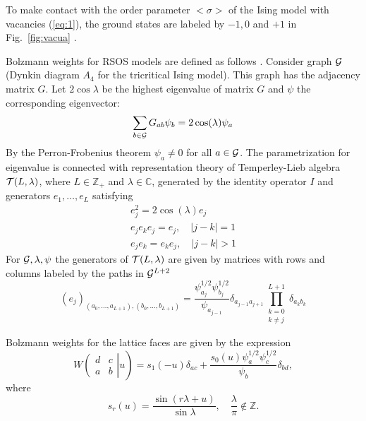 \documentclass[12pt]{article}
\begin{document}
To make contact with the order parameter $<\sigma>$ of the Ising model
with vacancies (\ref{eq:1}),  the ground states are labeled by $-1, 0$
and $+1$ in Fig.~\ref{fig:vacua} \cite{chim1996boundary}.

Bolzmann weights for RSOS models are defined as follows \cite{behrend2001integrable}. Consider
graph ${\cal G}$ (Dynkin diagram $A_4$ for the tricritical Ising
model). This graph has the adjacency matrix $G$. Let $2\cos\lambda$ be the
highest eigenvalue of matrix $G$ and $\psi$ the corresponding eigenvector:
\begin{equation}
  \label{eq:2}
  \sum_{b\in {\cal G}} G_{ab}\psi_b = 2\cos(\lambda) \psi_a
\end{equation}
By the Perron-Frobenius theorem $\psi_a \neq 0$ for all $a\in {\cal
  G}$. 
The parametrization for eigenvalue is connected with
representation theory of Temperley-Lieb algebra ${\cal T}(L,\lambda)$,
where $L\in \mathbb{Z}_+$ and $\lambda\in\mathbb{C}$, generated by the
identity operator $I$ and generators $e_1,\dots, e_L$ satisfying
\begin{equation}
  \label{eq:3}
  \begin{array}{l}
    e_j^2 = 2\cos(\lambda) e_j\\
    e_j e_k e_j = e_j, \quad |j-k|=1\\
    e_j e_k = e_k e_j , \quad |j-k|>1
  \end{array}
\end{equation}
For ${\cal G}, \lambda, \psi$ the generators of ${\cal T}(L,\lambda)$
are given by matrices with rows and columns labeled by the paths in ${\cal G}^{L+2}$
\begin{equation}
  \label{eq:4}
  \left(e_j\right)_{(a_0,\dots, a_{L+1}),(b_0,\dots,
    b_{L+1})}=\frac{\psi^{1/2}_{a_j} \psi^{1/2}_{b_j}}{\psi_{a_{j-1}}}
  \delta_{a_{j-1} a_{j+1}} \prod_{\substack{k=0\\k\neq j}}^{L+1}\delta_{a_k b_k}
\end{equation}

Bolzmann  weights for the lattice faces are given by the expression
\begin{equation}
  \label{eq:5}
  W\left.\left(
    \begin{array}{cc}
      d & c\\
      a & b
    \end{array}\right| u \right)
= s_1 (-u)\delta_{ac} + \frac{s_0 (u) \psi_a^{1/2}
  \psi_c^{1/2}}{\psi_b} \delta_{bd},
\end{equation}
where
  \begin{equation}
    \label{eq:6}
    s_r(u)=\frac{\sin(r\lambda+u)}{\sin\lambda},\quad \frac{\lambda}{\pi}\not\in\mathbb{Z}.
  \end{equation}
\end{document}

